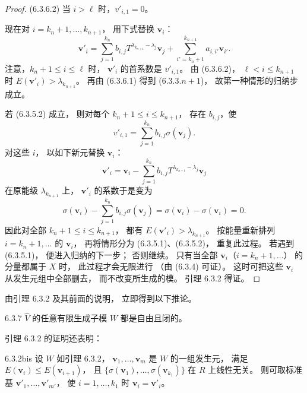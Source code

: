 \begin{proof}
\noindent\textup{(6.3.6.2)}\quad
当 $i>\ell$ 时，$v'_{i,1}=0$。

现在对 $i=k_n+1,\ldots,k_{n+1}$，
用下式替换 $\mathbf v_i$：
\[
\mathbf v'_i
=\sum_{j=1}^{k_n}
b_{i,j}T^{\lambda_{k_{n+1}}-\lambda_j}
\mathbf v_j
+\sum_{i'=k_n+1}^{k_{n+1}}
a_{i,i'}\mathbf v_{i'}.
\]
注意，$k_n+1\le i\le\ell$ 时，
$\mathbf v'_i$ 的首系数是 $v'_{i,1}$。
由 (6.3.6.2)，
$\ell<i\le k_{n+1}$ 时
$E(\mathbf v'_i)>\lambda_{k_{n+1}}$。
再由 (6.3.6.1) 得到
(6.3.3.$n+1$)，
故第一种情形的归纳步成立。

若 (6.3.5.2) 成立，
则对每个 $k_n+1\le i\le k_{n+1}$，
存在 $b_{i,j}$，使
\[
v'_{i,1}=\sum_{j=1}^{k_n}
b_{i,j}\sigma(\mathbf v_j).
\]
对这些 $i$，
以如下新元替换 $\mathbf v_i$：
\[
\mathbf v'_i
=\mathbf v_i
-\sum_{j=1}^{k_n}
b_{i,j}T^{\lambda_{k_{n+1}}-\lambda_j}
\mathbf v_j
\]
在原能级 $\lambda_{k_{n+1}}$ 上，
$\mathbf v'_i$ 的系数于是变为
\[
\sigma(\mathbf v_i)
-\sum_{j=1}^{k_n}
b_{i,j}\sigma(\mathbf v_j)
=\sigma(\mathbf v_i)-\sigma(\mathbf v_i)=0.
\]
因此对全部
$k_n+1\le i\le k_{n+1}$，
都有 $E(\mathbf v'_i)>\lambda_{k_{n+1}}$。
按能量重新排列
$i=k_n+1,\ldots$ 的 $\mathbf v_i$，
再将情形分为 (6.3.5.1)、(6.3.5.2)，
重复此过程。
若遇到 (6.3.5.1)，
便进入归纳的下一步；
否则继续。
只有当全部
$\mathbf v_i$（$i=k_n+1,\ldots$）
的分量都属于 $X$ 时，
此过程才会无限进行
（由 (6.3.4) 可证）。
这时可把这些 $\mathbf v_i$
从发生元组中全部删去，
而不改变所生成的模。
引理 6.3.2 得证。
\end{proof}

由引理 6.3.2 及其前面的说明，
立即得到以下推论。

\begin{corollary}{6.3.7}\label{cor:6-3-7}
$\widehat V$ 的任意有限生成子模 $W$
都是自由且闭的。
\end{corollary}

引理 6.3.2 的证明还表明：

\begin{lemma}{6.3.2bis}\label{lem:6-3-2bis}
设 $W$ 如引理 6.3.2，
$\mathbf v_1,\ldots,\mathbf v_m$
是 $W$ 的一组发生元，
满足 $E(\mathbf v_i)\le E(\mathbf v_{i+1})$，
且
$\{\sigma(\mathbf v_1),\ldots,
\sigma(\mathbf v_{k_1})\}$
在 $R$ 上线性无关。
则可取标准基
$\mathbf v'_1,\ldots,\mathbf v'_{m'}$，
使 $i=1,\ldots,k_1$ 时
$\mathbf v_i=\mathbf v'_i$。
\end{lemma}
